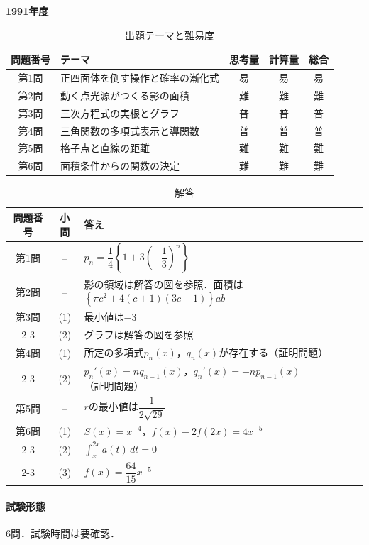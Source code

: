 \documentclass[../../main.tex]{subfiles}
\begin{document}
\begin{center}
  {\fontsize{48pt}{58pt}\selectfont \textbf{1991}\normalsize\textbf{年度}}
\end{center}

\begin{table}[htb]
  \centering
  \caption{出題テーマと難易度}
  \begin{tabular}{|c|p{6.2cm}|c|c|c|}
    \hline
    \textbf{問題番号} & \textbf{テーマ} & \textbf{思考量} & \textbf{計算量} & \textbf{総合} \\
    \hline
    第1問 & 正四面体を倒す操作と確率の漸化式 & 易 & 易 & 易 \\
    \hline
    第2問 & 動く点光源がつくる影の面積 & 難 & 難 & 難 \\
    \hline
    第3問 & 三次方程式の実根とグラフ & 普 & 普 & 普 \\
    \hline
    第4問 & 三角関数の多項式表示と導関数 & 普 & 普 & 普 \\
    \hline
    第5問 & 格子点と直線の距離 & 難 & 難 & 難 \\
    \hline
    第6問 & 面積条件からの関数の決定 & 難 & 難 & 難 \\
    \hline
  \end{tabular}
\end{table}

\begin{table}[htb]
  \centering
  \caption{解答}
  \renewcommand{\arraystretch}{1.4}
  \begin{tabular}{|c|c|p{9cm}|}
    \hline
    \textbf{問題番号} & \textbf{小問} & \textbf{答え} \\
    \hline
    第1問 & -- & $p_n=\dfrac{1}{4}\left\{1+3\left(-\dfrac{1}{3}\right)^n\right\}$ \\
    \hline
    第2問 & -- & 影の領域は解答の図を参照．面積は$\left\{\pi c^2+4(c+1)(3c+1)\right\}ab$ \\
    \hline
    第3問 & (1) & 最小値は$-3$ \\
    \cline{2-3}
    & (2) & グラフは解答の図を参照 \\
    \hline
    第4問 & (1) & 所定の多項式$p_n(x)$，$q_n(x)$が存在する（証明問題） \\
    \cline{2-3}
    & (2) & $p_n'(x)=nq_{n-1}(x)$，$q_n'(x)=-np_{n-1}(x)$（証明問題） \\
    \hline
    第5問 & -- & $r$の最小値は$\dfrac{1}{2\sqrt{29}}$ \\
    \hline
    第6問 & (1) & $S(x)=x^{-4}$，$f(x)-2f(2x)=4x^{-5}$ \\
    \cline{2-3}
    & (2) & $\displaystyle\int_x^{2x}a(t)\,dt=0$ \\
    \cline{2-3}
    & (3) & $f(x)=\dfrac{64}{15}x^{-5}$ \\
    \hline
  \end{tabular}
\end{table}

\paragraph{試験形態}
6問．試験時間は要確認．
\end{document}
